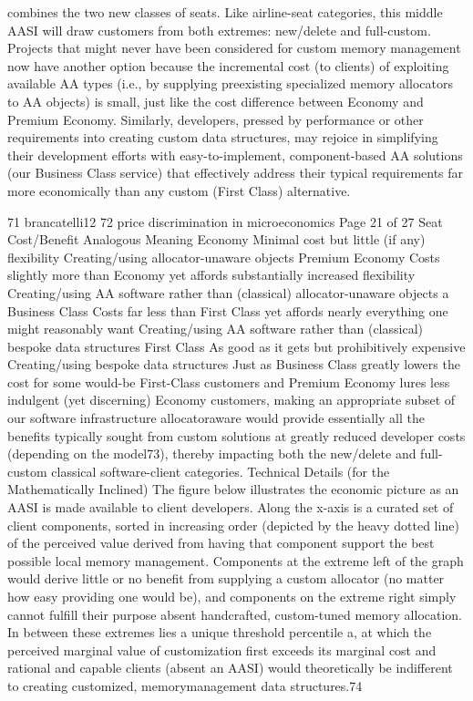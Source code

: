 combines the two new classes of seats. Like airline-seat categories, this middle AASI
will draw customers from both extremes: new/delete and full-custom. Projects that
might never have been considered for custom memory management now have
another option because the incremental cost (to clients) of exploiting available AA
types (i.e., by supplying preexisting specialized memory allocators to AA objects) is
small, just like the cost difference between Economy and Premium Economy.
Similarly, developers, pressed by performance or other requirements into creating
custom data structures, may rejoice in simplifying their development efforts with
easy-to-implement, component-based AA solutions (our Business Class service) that
effectively address their typical requirements far more economically than any
custom (First Class) alternative.

71 brancatelli12
72 price discrimination in microeconomics
Page 21 of 27
Seat Cost/Benefit Analogous Meaning
Economy Minimal cost but little (if any) flexibility Creating/using allocator-unaware objects
Premium
Economy
Costs slightly more than Economy yet
affords substantially increased flexibility
Creating/using AA software rather than
(classical) allocator-unaware objects a
Business
Class
Costs far less than First Class yet affords
nearly everything one might reasonably want
Creating/using AA software rather than
(classical) bespoke data structures
First
Class
As good as it gets but prohibitively
expensive
Creating/using bespoke data structures
Just as Business Class greatly lowers the cost for some would-be First-Class
customers and Premium Economy lures less indulgent (yet discerning) Economy
customers, making an appropriate subset of our software infrastructure allocatoraware would provide essentially all the benefits typically sought from custom
solutions at greatly reduced developer costs (depending on the model73), thereby
impacting both the new/delete and full-custom classical software-client categories.
Technical Details (for the Mathematically Inclined)
The figure below illustrates the economic picture as an AASI is made available to
client developers. Along the x-axis is a curated set of client components, sorted in
increasing order (depicted by the heavy dotted line) of the perceived value derived
from having that component support the best possible local memory management.
Components at the extreme left of the graph would derive little or no benefit from
supplying a custom allocator (no matter how easy providing one would be), and
components on the extreme right simply cannot fulfill their purpose absent
handcrafted, custom-tuned memory allocation. In between these extremes lies a
unique threshold percentile a, at which the perceived marginal value of
customization first exceeds its marginal cost and rational and capable clients
(absent an AASI) would theoretically be indifferent to creating customized, memorymanagement data structures.74

